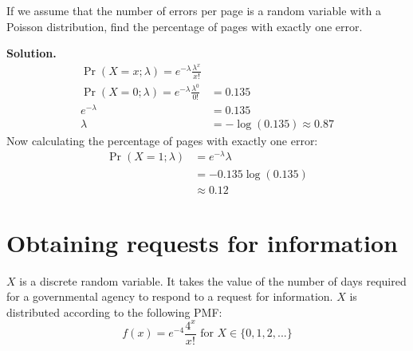 \documentclass[12pt]{article}
\begin{document}
If we assume that the number of errors per page is a random variable with a Poisson distribution, find the
percentage of pages with exactly one error.

\textbf{Solution.}
\begin{align*}
    \Pr(X=x; \lambda) = e^{-\lambda}\frac{\lambda^x}{x!}
    \\ \Pr(X=0;\lambda) = e^{-\lambda}\frac{\lambda^0}{0!} &= 0.135
    \\  e^{-\lambda} &= 0.135
    \\ \lambda &= -\log(0.135)\approx 0.87
\end{align*}
Now calculating the percentage of pages with exactly one error:
\begin{align*}
    \Pr(X=1;\lambda) &= e^{-\lambda}\lambda 
    \\ &= -0.135\log(0.135)
    \\ &\approx 0.12
\end{align*}


\section{Obtaining requests for information}
$X$ is a discrete random variable. It takes the value of the number of days required for a governmental agency to respond to a request for information. $X$ is distributed according to the following PMF:
\[ f(x) = e^{-4} \frac{4^x}{x!} \text{ for } X\in\{0,1,2,...\} \]
\end{document}
